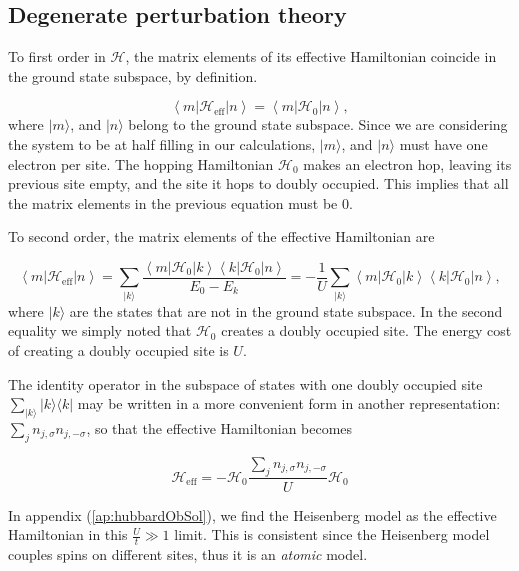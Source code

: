 \subsection{Degenerate perturbation theory}

To first order in $\mathcal{H}$, the matrix elements of its effective Hamiltonian coincide in the ground state subspace, by definition.

\begin{equation}
\left\langle m | \mathcal{H}_{\text{eff}} | n \right\rangle = \left\langle m | \mathcal{H}_0 | n \right\rangle ,
\end{equation}
where $| m \rangle$, and $| n \rangle$ belong to the ground state subspace.
Since we are considering the system to be at half filling in our calculations, $| m\rangle$, and $| n \rangle$ must have one electron per site.
The hopping Hamiltonian $\mathcal{H}_0$ makes an electron hop, leaving its previous site empty, and the site it hops to doubly occupied.
This implies that all the matrix elements in the previous equation must be 0.

To second order, the matrix elements of the effective Hamiltonian are

\begin{equation}
\left \langle m | \mathcal{H}_{\text{eff}} | n \right\rangle = \sum_{ | k \rangle} \frac{\left\langle m | \mathcal{H}_0 | k \right\rangle \left\langle k | \mathcal{H}_0 | n \right\rangle }{E_0 - E_k} =-\frac{1}{U} \sum_{ | k \rangle} \left\langle m | \mathcal{H}_0 | k \right\rangle \left\langle k | \mathcal{H}_0 | n \right\rangle ,
\end{equation}
where $| k \rangle$ are the states that are not in the ground state subspace.
In the second equality we simply noted that $\mathcal{H}_0$ creates a doubly occupied site.
The energy cost of creating a doubly occupied site is $U$. 

The identity operator in the subspace of states with one doubly occupied site
$
\sum_{ | k \rangle} | k \rangle \langle k |
$
may be written in a more convenient form in another representation:
$
\sum_j n_{j,\sigma} n_{j, -\sigma}
$, 
so that the effective Hamiltonian becomes

\begin{equation}\label{eq:degPert}
\mathcal{H}_{\text{eff}} = - \mathcal{H}_0 \frac{\sum_j n_{j,\sigma} n_{j, -\sigma}}{U} \mathcal{H}_0
\end{equation}

In appendix (\ref{ap:hubbardObSol}), we find the Heisenberg model as the effective Hamiltonian in this $\frac{U}{t} \gg 1$ limit.
This is consistent since the Heisenberg model couples spins on different sites, thus it is an \emph{atomic} model.

